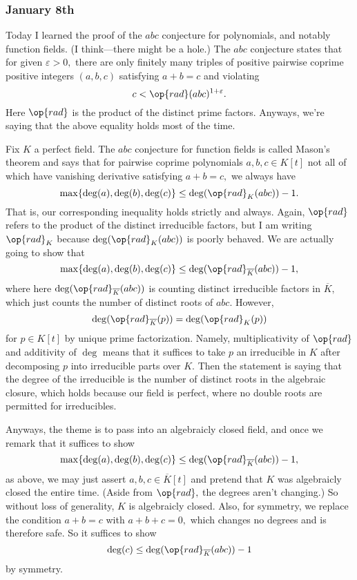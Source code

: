 \subsubsection{January 8th}
Today I learned the proof of the $abc$ conjecture for polynomials, and notably function fields. (I think---there might be a hole.) The $abc$ conjecture states that for given $\varepsilon>0,$ there are only finitely many triples of positive pairwise coprime positive integers $(a,b,c)$ satisfying $a+b=c$ and violating
\[c<\op{rad}(abc)^{1+\varepsilon}.\]
Here $\op{rad}$ is the product of the distinct prime factors. Anyways, we're saying that the above equality holds most of the time.

Fix $K$ a perfect field. The $abc$ conjecture for function fields is called Mason's theorem and says that for pairwise coprime polynomials $a,b,c\in K[t]$ not all of which have vanishing derivative satisfying $a+b=c,$ we always have
\[\max\{\deg(a),\deg(b),\deg(c)\}\le\deg(\op{rad}_K(abc))-1.\]
That is, our corresponding inequality holds strictly and always. Again, $\op{rad}$ refers to the product of the distinct irreducible factors, but I am writing $\op{rad}_K$ because $\deg(\op{rad}_K(abc))$ is poorly behaved. We are actually going to show that
\[\max\{\deg(a),\deg(b),\deg(c)\}\le\deg(\op{rad}_{\overline K}(abc))-1,\]
where here $\deg(\op{rad}_{\overline K}(abc))$ is counting distinct irreducible factors in $\overline K,$ which just counts the number of distinct roots of $abc.$ However,
\[\deg(\op{rad}_{\overline K}(p))=\deg(\op{rad}_K(p))\]
for $p\in K[t]$ by unique prime factorization. Namely, multiplicativity of $\op{rad}$ and additivity of $\deg$ means that it suffices to take $p$ an irreducible in $K$ after decomposing $p$ into irreducible parts over $K.$ Then the statement is saying that the degree of the irreducible is the number of distinct roots in the algebraic closure, which holds because our field is perfect, where no double roots are permitted for irreducibles.

Anyways, the theme is to pass into an algebraicly closed field, and once we remark that it suffices to show
\[\max\{\deg(a),\deg(b),\deg(c)\}\le\deg(\op{rad}_{\overline K}(abc))-1,\]
as above, we may just assert $a,b,c\in\overline K[t]$ and pretend that $K$ was algebraicly closed the entire time. (Aside from $\op{rad},$ the degrees aren't changing.) So without loss of generality, $K$ is algebraicly closed. Also, for symmetry, we replace the condition $a+b=c$ with $a+b+c=0,$ which changes no degrees and is therefore safe. So it suffices to show
\[\deg(c)\le\deg(\op{rad}_{\overline K}(abc))-1\]
by symmetry.

